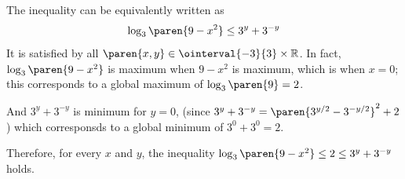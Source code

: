 The inequality can be equivalently written as
\begin{equation*}
\log_3\paren{9 - x^2} \leq 3^{y} + 3^{-y}
\end{equation*}
It is satisfied by all $\paren{x, y} \in \ointerval{-3}{3} \times \mathbb{R}$.
In fact, $\log_3\paren{9 - x^2}$ is maximum when $9 - x^2$ is maximum,
which is when $x = 0$;
this corresponds to a global maximum of $\log_3\paren{9} = 2$.

And $3^{y} + 3^{-y}$ is minimum for $y = 0$,
(since $3^y + 3^{-y} = \paren{3^{y/2} - 3^{- y/2}}^2 + 2$)
which corresponsds to a global minimum of $3^0 + 3^0 = 2$.

Therefore, for every $x$ and $y$, the inequality
$\log_3\paren{9 - x^2} \leq 2 \leq 3^{y} + 3^{-y}$ holds.
